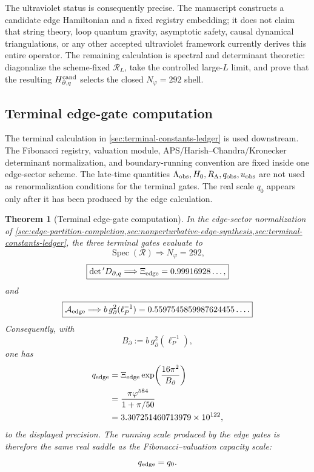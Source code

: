 \documentclass[aps,prd,reprint,nofootinbib,superscriptaddress,floatfix]{revtex4-2}
\numberwithin{equation}{section}
\theoremstyle{definition}
\theoremstyle{plain}
\newtheorem{theorem}{Theorem}[section]
\begin{document}
The ultraviolet status is consequently precise.  The manuscript constructs a
candidate edge Hamiltonian and a fixed registry embedding; it does not claim
that string theory, loop quantum gravity, asymptotic safety, causal dynamical
triangulations, or any other accepted ultraviolet framework currently derives
this entire operator.  The remaining calculation is spectral and determinant
theoretic: diagonalize the scheme-fixed \(\mathcal R_L\), take the controlled
large-\(L\) limit, and prove that the resulting \(H_{\partial,q}^{\rm cand}\)
selects the closed \(N_\varphi=292\) shell.




\subsection{Terminal edge-gate computation}
\label{subsec:computed-gate-theorem}

The terminal calculation in \cref{sec:terminal-constants-ledger} is used
downstream.  The Fibonacci registry, valuation module,
APS/Harish--Chandra/Kronecker determinant normalization, and boundary-running
convention are fixed inside one edge-sector scheme.  The late-time quantities
\(\Lambda_{\rm obs},H_0,R_\Lambda,q_{\rm obs},u_{\rm obs}\) are not used as
renormalization conditions for the terminal gates.  The real scale \(q_0\)
appears only after it has been produced by the edge calculation.

\begin{theorem}[Terminal edge-gate computation]
\label{thm:autonomous-terminal-edge-gates}
In the edge-sector normalization of
\cref{sec:edge-partition-completion,sec:nonperturbative-edge-synthesis,sec:terminal-constants-ledger},
the three terminal gates evaluate to
\[
\boxed{
\operatorname{Spec}(\mathcal R)\Longrightarrow N_\varphi=292,
}
\]
\[
\boxed{
\det{}'D_{\partial,q}\Longrightarrow
\Xi_{\rm edge}=0.99916928\ldots,
}
\]
and
\[
\boxed{
\mathcal A_{\rm edge}\Longrightarrow
b\,g_\partial^2(\ell_P^{-1})
=
0.5597545859987624455\ldots .
}
\]
Consequently, with
\[
B_\partial:=b\,g_\partial^2(\ell_P^{-1}),
\]
one has
\[
\begin{aligned}
q_{\rm edge}
&=
\Xi_{\rm edge}\exp\!\left(\frac{16\pi^2}{B_\partial}\right)
\\
&=
\frac{\pi\varphi^{584}}{1+\pi/50}
\\
&=
3.307251460713979\times10^{122},
\end{aligned}
\]
to the displayed precision.  The running scale produced by the edge gates is
therefore the same real saddle as the Fibonacci--valuation capacity scale:
\[
q_{\rm edge}=q_0 .
\]
\end{theorem}
\end{document}

